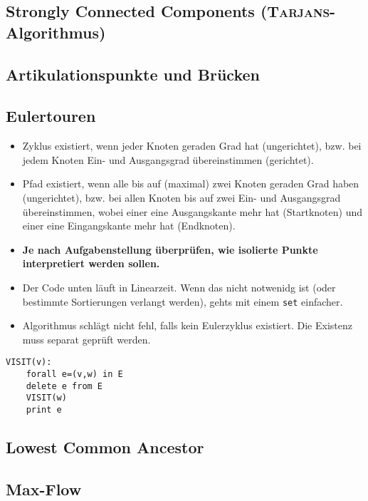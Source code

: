 \subsection{Strongly Connected Components (\textsc{Tarjans}-Algorithmus)}


\subsection{Artikulationspunkte und Brücken}


\subsection{Eulertouren}
\begin{itemize}[nosep]
	\item Zyklus existiert, wenn jeder Knoten geraden Grad hat (ungerichtet), bzw. bei jedem Knoten Ein- und Ausgangsgrad übereinstimmen (gerichtet).
	\item Pfad existiert, wenn alle bis auf (maximal) zwei Knoten geraden Grad haben (ungerichtet), bzw. bei allen Knoten bis auf zwei Ein- und Ausgangsgrad übereinstimmen, wobei einer eine Ausgangskante mehr hat (Startknoten) und einer eine Eingangskante mehr hat (Endknoten).
	\item \textbf{Je nach Aufgabenstellung überprüfen, wie isolierte Punkte interpretiert werden sollen.}
	\item Der Code unten läuft in Linearzeit.
	Wenn das nicht notwenidg ist (oder bestimmte Sortierungen verlangt werden), gehts mit einem \lstinline{set} einfacher.
	\item Algorithmus schlägt nicht fehl, falls kein Eulerzyklus existiert.
	Die Existenz muss separat geprüft werden.
\end{itemize}
\begin{lstlisting}
VISIT(v):
	forall e=(v,w) in E
	delete e from E
	VISIT(w)
	print e
\end{lstlisting}


\subsection{Lowest Common Ancestor}


\subsection{Max-Flow}

